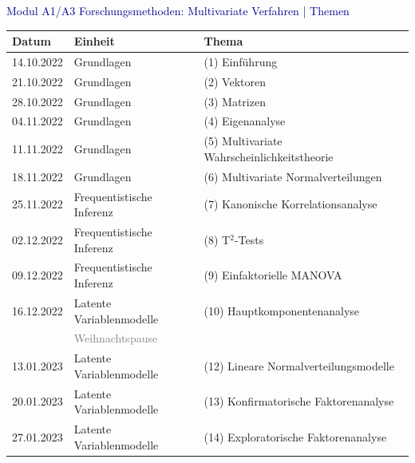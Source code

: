 \documentclass[
  8pt,
  ignorenonframetext,
]{beamer}
\begin{document}
\begin{frame}{}
\protect\hypertarget{section-2}{}
\vspace{2mm}

\textcolor{darkblue}{Modul A1/A3 Forschungsmethoden: Multivariate Verfahren | Themen}
\vspace{2mm}

\center
\footnotesize
\renewcommand{\arraystretch}{1.1}
\begin{tabular}{lll}
Datum        & Einheit                          & Thema                                       \\\hline
14.10.2022   & Grundlagen                       & (1) Einführung                              \\
21.10.2022   & Grundlagen                       & (2) Vektoren                                \\
28.10.2022   & Grundlagen                       & (3) Matrizen                                \\
04.11.2022   & Grundlagen                       & (4) Eigenanalyse                            \\
11.11.2022   & Grundlagen                       & (5) Multivariate Wahrscheinlichkeitstheorie \\
18.11.2022   & Grundlagen                       & (6) Multivariate Normalverteilungen         \\
25.11.2022   & Frequentistische Inferenz        & (7) Kanonische Korrelationsanalyse          \\
02.12.2022   & Frequentistische Inferenz        & (8) T$^2$-Tests                             \\
09.12.2022   & Frequentistische Inferenz        & (9) Einfaktorielle MANOVA                   \\
16.12.2022   & Latente Variablenmodelle         & (10) Hauptkomponentenanalyse                \\
             & \textcolor{gray}{Weihnachtspause}                                              \\
13.01.2023   & Latente Variablenmodelle         & (12) Lineare Normalverteilungsmodelle       \\
20.01.2023   & Latente Variablenmodelle         & (13) Konfirmatorische Faktorenanalyse       \\
27.01.2023   & Latente Variablenmodelle         & (14) Exploratorische Faktorenanalyse        \\ 
\end{tabular}
\end{frame}
\end{document}
